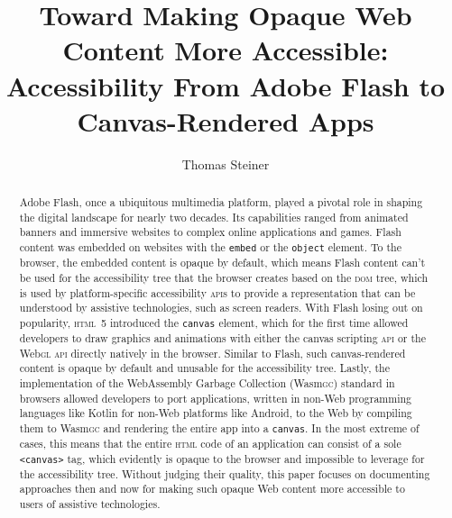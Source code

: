 \documentclass[sigconf]{acmart}
\begin{document}
\title[Toward Making Opaque Web Content More Accessible]{Toward Making Opaque Web Content More Accessible: \protect\\ Accessibility From Adobe Flash to Canvas-Rendered Apps}

\author{Thomas Steiner}


\begin{abstract}
Adobe Flash, once a ubiquitous multimedia platform, played a pivotal role in shaping the digital landscape for nearly two decades. Its capabilities ranged from animated banners and immersive websites to complex online applications and games. Flash content was embedded on websites with the \texttt{embed} or the \texttt{object} element. To the browser, the embedded content is opaque by default, which means Flash content can't be used for the accessibility tree that the browser creates based on the \textsc{dom} tree, which is used by platform-specific accessibility \textsc{api}s to provide a representation that can be understood by assistive technologies, such as screen readers. With Flash losing out on popularity, \textsc{html}\ 5 introduced the \texttt{canvas} element, which for the first time allowed developers to draw graphics and animations with either the canvas scripting \textsc{api} or the Web\textsc{gl} \textsc{api} directly natively in the browser. Similar to Flash, such canvas-rendered content is opaque by default and unusable for the accessibility tree. Lastly, the implementation of the WebAssembly Garbage Collection (Wasm\textsc{gc}) standard in browsers allowed developers to port applications, written in non-Web programming languages like Kotlin for non-Web platforms like Android, to the Web by compiling them to Wasm\textsc{gc} and rendering the entire app into a \texttt{canvas}. In the most extreme of cases, this means that the entire \textsc{html} code of an application can consist of a sole \texttt{<canvas>} tag, which evidently is opaque to the browser and impossible to leverage for the accessibility tree. Without judging their quality, this paper focuses on documenting approaches then and now for making such opaque Web content more accessible to users of assistive technologies.
\end{abstract}
\end{document}
